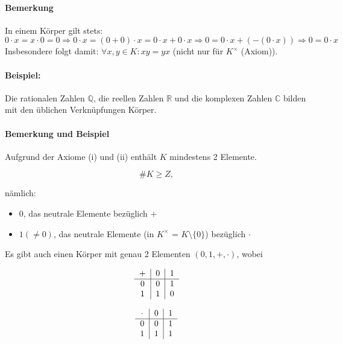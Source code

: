 \documentclass[12pt,a4paper,parskip=half-,DIV=15]{scrreprt}
\begin{document}
\paragraph{Bemerkung} In einem Körper gilt stets:
\begin{equation*}
0\cdot x = x\cdot 0 = 0 \Rightarrow
0\cdot x = (0+0)\cdot x = 0\cdot x + 0\cdot x \Rightarrow
0 = 0\cdot x + (-(0\cdot x)) \Rightarrow 0 = 0\cdot x
\end{equation*}
Insbesondere folgt damit: $\forall x,y\in K: xy = yx$ (nicht nur für $K^\times$ (Axiom)).
\paragraph{Beispiel:} Die rationalen Zahlen $\mathbb{Q}$, die reellen Zahlen $\mathbb{R}$ und die komplexen Zahlen $\mathbb{C}$ bilden mit den üblichen Verknüpfungen Körper.

\paragraph{Bemerkung und Beispiel} Aufgrund der Axiome (i) und (ii) enthält $ K $ mindestens 2 Elemente.

\begin{equation*}
\# K \geq Z,
\end{equation*}

nämlich:
\begin{itemize}
\item $ 0 $, das neutrale Elemente bezüglich $+$
\item $1 (\neq 0)$, das neutrale Elemente (in $K^\times$ = $K\setminus\{0\}$) bezüglich $\cdot$
\end{itemize}

Es gibt auch einen Körper mit genau 2 Elementen $({0,1},+,\cdot)$, wobei

\begin{minipage}{0.45\textwidth}
\begin{equation*}
\begin{tabular}{c|c|c}
	$+$ & 0 & 1\\\hline
	0 & 0 & 1\\
	1 & 1 & 0\\
\end{tabular}
\end{equation*}
\end{minipage}
\begin{minipage}{0.45\textwidth}
\begin{equation*}
\begin{tabular}{c|c|c}
$\cdot$ & 0 & 1\\\hline
0 & 0 & 1\\
1 & 1 & 1\\
\end{tabular}
\end{equation*}
\end{minipage}
\end{document}
